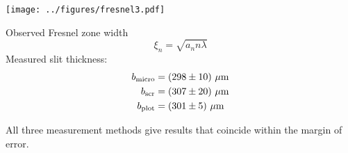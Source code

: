 




\begin{minipage}{0.48\textwidth}
        \hspace{-1cm}
        \texttt{[image: ../figures/fresnel3.pdf]}
\end{minipage}
\hfill
\begin{minipage}{0.48\textwidth}
    Observed  Fresnel zone width
    \begin{equation*}
        \xi_n = \sqrt{a_n n \lambda}
    \end{equation*}
    Measured slit thickness:
    \begin{align*}
        b_{\text{micro}} &= (298 \pm 10) \ \mu\text{m} \\
        b_{\text{scr}} &= (307 \pm 20) \ \mu\text{m} \\
        \vspace{3mm}
        b_{\text{plot}} &= (301 \pm 5) \ \mu\text{m} \\
    \end{align*}

    

    All three measurement methods give results that coincide within the margin of error.
\end{minipage}
